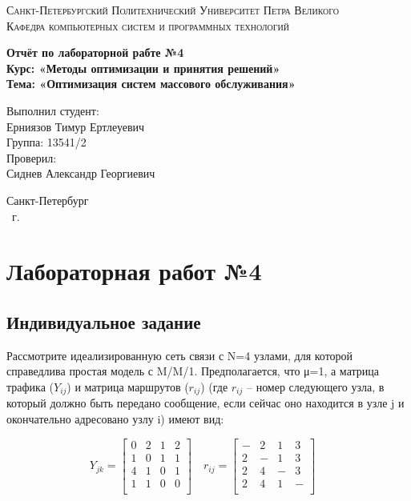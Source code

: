 \documentclass[14pt,a4paper,report]{report}
\begin{document}
\def\contentsname{Содержание}

\begin{titlepage}
	\begin{center}
		\textsc{Санкт-Петербургский Политехнический 
			Университет Петра Великого\\[5mm]
			Кафедра компьютерных систем и программных технологий}
		
		\vfill
		
		\textbf{Отчёт по лабораторной рабте №4\\[3mm]
			Курс: «Методы оптимизации и принятия решений»\\[3mm]
			Тема: «Оптимизация систем массового обслуживания»\\[35mm]
			}
	\end{center}
	
	\hfill
	\begin{minipage}{.5\textwidth}
		Выполнил студент:\\[2mm] 
		Ерниязов Тимур Ертлеуевич\\
		Группа: 13541/2\\[5mm]
		
		Проверил:\\[2mm] 
		Сиднев Александр Георгиевич
	\end{minipage}
	\vfill
	\begin{center}
		Санкт-Петербург\\ \the\year\ г.
	\end{center}
\end{titlepage}

\tableofcontents
\clearpage

\chapter{Лабораторная работ №4}

\section{Индивидуальное задание}

Рассмотрите идеализированную сеть связи с N=4 узлами, для которой справедлива простая модель с M/M/1. Предполагается, что μ=1, а матрица трафика ($Y_{ij}$) и матрица маршрутов ($r_{ij}$) (где $r_{ij}$ – номер следующего узла, в который должно быть передано сообщение, если сейчас оно находится в узле j и окончательно адресовано узлу i) имеют вид:


$$Y_{jk} = 
\begin{bmatrix} 
0 & 2 & 1 & 2 \\
1 & 0 & 1 & 1 \\
4 & 1 & 0 & 1 \\
1 & 1 & 0 & 0 \\
\end{bmatrix}
\quad 
r_{ij} = 
\begin{bmatrix} 
- & 2 & 1 & 3 \\
2 & - & 1 & 3 \\
2 & 4 & - & 3 \\
2 & 4 & 1 & - \\
\end{bmatrix}
\quad $$
\end{document}
